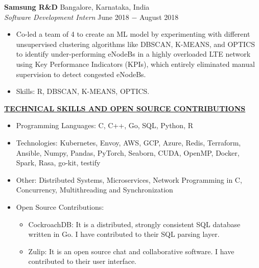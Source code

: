 \documentclass{article}
\begin{document}
\noindent \textbf{Samsung R\&D} \hfill Bangalore, Karnataka, India \\
\textit{Software Development Intern} \hfill June 2018 $-$ August 2018
\begin{itemize}[noitemsep,nolistsep,leftmargin=*]
\item {Co-led a team of 4 to create an ML model by experimenting with different unsupervised clustering algorithms like DBSCAN, K-MEANS, and OPTICS to identify under-performing eNodeBs in a highly overloaded LTE network using Key Performance Indicators (KPIs), which entirely eliminated manual supervision to detect congested eNodeBs.}
\item{Skills: R, DBSCAN, K-MEANS, OPTICS.\\}
\end{itemize}

\noindent \textbf{\underline{TECHNICAL SKILLS AND OPEN SOURCE CONTRIBUTIONS}}
\begin{itemize}[noitemsep,nolistsep,leftmargin=*]
\item {Programming Languages: C, C++, Go, SQL, Python, R}
\item {Technologies:  Kubernetes, Envoy, AWS, GCP, Azure, Redis, Terraform, Ansible, Numpy, Pandas, PyTorch, Seaborn, CUDA, OpenMP, Docker, Spark, Rasa, go-kit, testify}
\item {Other: Distributed Systems, Microservices, Network Programming in C, Concurrency, Multithreading and Synchronization}
\item {Open Source Contributions:}
\begin{itemize}
    \item CockroachDB: It is a distributed, strongly consistent SQL database written in Go. I have contributed to their SQL parsing layer. 
    \item Zulip: It is an open source chat and collaborative software. I have contributed to their user interface.
\end{itemize}
\end{itemize}

%
%
\end{document}
